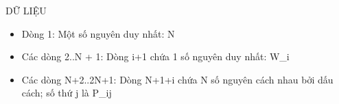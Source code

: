 DỮ LIỆU
\begin{itemize}
	\item     Dòng 1: Một số nguyên duy nhất: N   
	\item     Các dòng 2..N + 1: Dòng i+1 chứa 1 số nguyên duy nhất: W\_i   
	\item     Các dòng N+2..2N+1: Dòng N+1+i chứa N số nguyên cách nhau bởi dấu cách; số thứ         j là P\_ij   
\end{itemize}